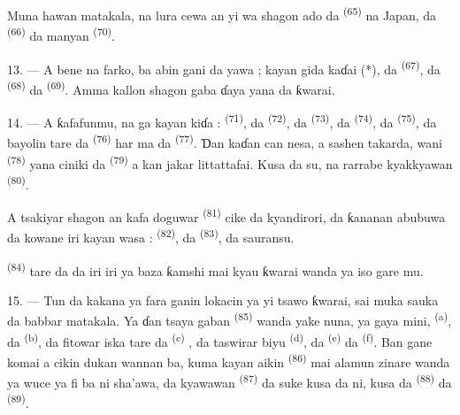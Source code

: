 Muna hawan matakala, na lura cewa an yi wa shagon ado da
 \textsuperscript{(65)} na Japan, da 
\textsuperscript{(66)} da manyan  \textsuperscript{(70)}.

13. --- A bene na farko, ba abin gani da yawa ; kayan gida kaɗai (*),
da  \textsuperscript{(67)}, da  \textsuperscript{(68)} da  \textsuperscript{(69)}. Amma
kallon shagon gaba ɗaya yana da  ƙwarai.

14. --- A ƙafafunmu, na ga kayan kiɗa : 
\textsuperscript{(71)}, da  \textsuperscript{(72)}, da
 \textsuperscript{(73)}, da 
\textsuperscript{(74)}, da  \textsuperscript{(75)}, da
bayolin tare da  \textsuperscript{(76)} har ma da  \textsuperscript{(77)}. Ɗan kaɗan can nesa, a sashen takarda, wani
 \textsuperscript{(78)} yana ciniki da 
\textsuperscript{(79)} a kan jakar littattafai. Kusa da su, na rarrabe
kyakkyawan  \textsuperscript{(80)}.

A tsakiyar shagon an kafa doguwar 
\textsuperscript{(81)} cike da kyandirori, da ƙananan abubuwa da kowane iri
kayan wasa :  \textsuperscript{(82)}, da  \textsuperscript{(83)}, da sauransu.

 \textsuperscript{(84)} tare da  da  iri iri ya baza ƙamshi mai kyau ƙwarai wanda
ya iso gare mu.

\VUsaut{3.4mm}
\VUsaut{2.8mm}

15. --- Tun da kakana ya fara ganin lokacin ya yi tsawo ƙwarai, sai
muka sauka da babbar matakala. Ya ɗan tsaya gaban  \textsuperscript{(85)} wanda yake nuna, ya gaya mini,
 \textsuperscript{(a)}, da  \textsuperscript{(b)}, da fitowar iska tare da  \textsuperscript{(c)} , da
taswirar  biyu \textsuperscript{(d)}, da
 \textsuperscript{(e)} da 
\textsuperscript{(f)}. Ban gane komai a cikin dukan wannan ba, kuma
kayan aikin  \textsuperscript{(86)} mai alamun
zinare wanda ya wuce ya fi ba ni sha’awa, da kyawawan  \textsuperscript{(87)} da suke kusa da ni, kusa da  \textsuperscript{(88)} da  \textsuperscript{(89)}.

